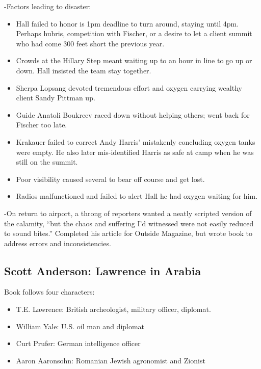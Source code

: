 \documentclass[
]{article}
\begin{document}
-Factors leading to disaster:

\begin{itemize}
\item
  Hall failed to honor is 1pm deadline to turn around, staying until
  4pm. Perhaps hubris, competition with Fischer, or a desire to let a
  client summit who had come 300 feet short the previous year.
\item
  Crowds at the Hillary Step meant waiting up to an hour in line to go
  up or down. Hall insisted the team stay together.
\item
  Sherpa Lopsang devoted tremendous effort and oxygen carrying wealthy
  client Sandy Pittman up.
\item
  Guide Anatoli Boukreev raced down without helping others; went back
  for Fischer too late.
\item
  Krakauer failed to correct Andy Harris' mistakenly concluding oxygen
  tanks were empty. He also later mis-identified Harris as safe at camp
  when he was still on the summit.
\item
  Poor visibility caused several to bear off course and get lost.
\item
  Radios malfunctioned and failed to alert Hall he had oxygen waiting
  for him.
\end{itemize}

-On return to airport, a throng of reporters wanted a neatly scripted
version of the calamity, ``but the chaos and suffering I'd witnessed
were not easily reduced to sound bites.'' Completed his article for
Outside Magazine, but wrote book to address errors and inconsistencies.

\hypertarget{scott-anderson-lawrence-in-arabia}{%
\subsection{Scott Anderson: Lawrence in
Arabia}\label{scott-anderson-lawrence-in-arabia}}

Book follows four characters:

\begin{itemize}
\item
  T.E. Lawrence: British archeologist, military officer, diplomat.
\item
  William Yale: U.S. oil man and diplomat
\item
  Curt Prufer: German intelligence officer
\item
  Aaron Aaronsohn: Romanian Jewish agronomist and Zionist
\end{itemize}
\end{document}
